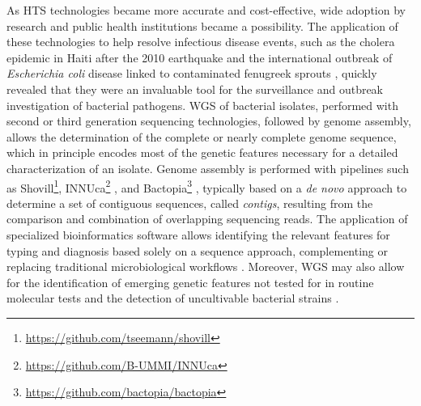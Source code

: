 As \ac{HTS} technologies became more accurate and cost-effective, wide adoption by research and public health institutions became a possibility. The application of these technologies to help resolve infectious disease events, such as the cholera epidemic in Haiti after the 2010 earthquake \cite{barzilay_cholera_2013} and the international outbreak of \textit{Escherichia coli} disease linked to contaminated fenugreek sprouts \cite{king_outbreak_2012, mellmann_prospective_2011}, quickly revealed that they were an invaluable tool for the surveillance and outbreak investigation of bacterial pathogens. \ac{WGS} of bacterial isolates, performed with second or third generation sequencing technologies, followed by genome assembly, allows the determination of the complete or nearly complete genome sequence, which in principle encodes most of the genetic features necessary for a detailed characterization of an isolate. Genome assembly is performed with pipelines such as Shovill\footnote{\url{https://github.com/tseemann/shovill}}, INNUca\footnote{\url{https://github.com/B-UMMI/INNUca}} \cite{prjibelski_using_2020, walker_pilon_2014, bolger_trimmomatic_2014}, and Bactopia\footnote{\url{https://github.com/bactopia/bactopia}} \cite{petit_bactopia_2020}, typically based on a \textit{de novo} approach to determine a set of contiguous sequences, called \textit{contigs}, resulting from the comparison and combination of overlapping sequencing reads. The application of specialized bioinformatics software allows identifying the relevant features for typing and diagnosis based solely on a sequence approach, complementing or replacing traditional microbiological workflows \cite{besser_next-generation_2018, deurenberg_application_2017}. Moreover, \ac{WGS} may also allow for the identification of emerging genetic features not tested for in routine molecular tests and the detection of uncultivable bacterial strains \cite{deurenberg_application_2017}.


